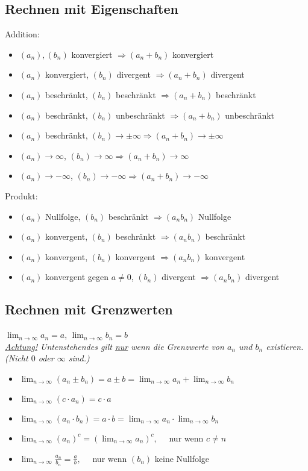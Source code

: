 \subsection{Rechnen mit Eigenschaften}
Addition:
{\small
\begin{itemize}
  \item $(a_n), (b_n)$ konvergiert $\Rightarrow (a_n + b_n)$ konvergiert
  \item $(a_n)$ konvergiert, $(b_n)$ divergent $\Rightarrow (a_n + b_n)$
  divergent
  \item $(a_n)$ beschränkt, $(b_n)$ beschränkt $\Rightarrow (a_n + b_n)$
  beschränkt
  \item $(a_n)$ beschränkt, $(b_n)$ unbeschränkt $\Rightarrow (a_n + b_n)$
  unbeschränkt
  \item $(a_n)$ beschränkt, $(b_n) \to \pm \infty \Rightarrow (a_n + b_n) \to
  \pm \infty$
  \item $(a_n) \to \infty$, $(b_n) \to \infty \Rightarrow (a_n + b_n) \to \infty$
  \item $(a_n) \to -\infty$, $(b_n) \to -\infty \Rightarrow (a_n + b_n) \to
  -\infty$
\end{itemize}
}

Produkt:
{\small
\begin{itemize}
  \item $(a_n)$ Nullfolge, $(b_n)$ beschränkt $\Rightarrow (a_n b_n)$ Nullfolge
  \item $(a_n)$ konvergent, $(b_n)$ beschränkt $\Rightarrow (a_n b_n)$
  beschränkt
  \item $(a_n)$ konvergent, $(b_n)$ konvergent $\Rightarrow (a_n b_n)$
  konvergent
  \item $(a_n)$ konvergent gegen $a \neq 0$, $(b_n)$ divergent $\Rightarrow
  (a_n b_n)$ divergent
\end{itemize}
}

\subsection{Rechnen mit Grenzwerten}
$\lim_{n \to \infty} a_n = a$, $\lim_{n \to \infty} b_n = b$\\
\emph{\underline{Achtung!} Untenstehendes gilt \underline{nur} wenn die Grenzwerte von $a_n$ und $b_n$ existieren. (Nicht $0$ oder $\infty$ sind.)}
\begin{itemize}
  \item $\lim_{n \to \infty} (a_n \pm b_n) = a \pm b = \lim_{n \to \infty} a_n + \lim_{n \to \infty} b_n$
  \item $\lim_{n \to \infty} (c \cdot a_n) = c \cdot a$
  \item $\lim_{n \to \infty} (a_n \cdot b_n) = a \cdot b = \lim_{n \to \infty} a_n \cdot \lim_{n \to \infty} b_n$
  \item $\lim_{n \to \infty} (a_n)^c = (\lim_{n \to \infty} a_n)^c, \quad$ nur wenn $c \neq n$
  \item $\lim_{n \to \infty} \frac{a_n}{b_n} = \frac{a}{b}, \quad$ nur wenn $(b_n)$ keine Nullfolge
\end{itemize}

